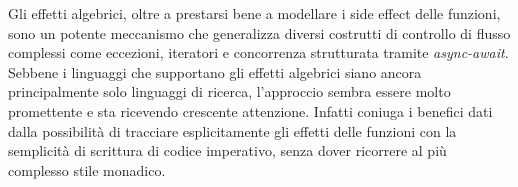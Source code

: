 Gli effetti algebrici, oltre a prestarsi bene a modellare i side effect delle funzioni, sono un potente meccanismo che generalizza diversi costrutti di controllo di flusso complessi come eccezioni, iteratori e concorrenza strutturata tramite \emph{async-await}.
Sebbene i linguaggi che supportano gli effetti algebrici siano ancora principalmente solo linguaggi di ricerca, l'approccio sembra essere molto promettente e sta ricevendo crescente attenzione. Infatti coniuga i benefici dati dalla possibilità di tracciare esplicitamente gli effetti delle funzioni con la semplicità di scrittura di codice imperativo, senza dover ricorrere al più complesso stile monadico.
